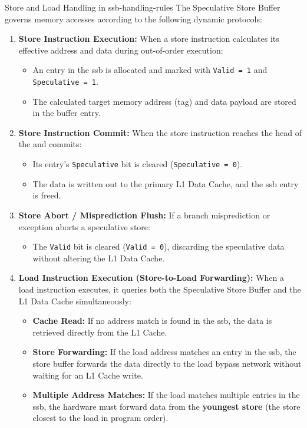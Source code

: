 \begin{definition}{Store and Load Handling in }{ssb-handling-rules}
The Speculative Store Buffer governs memory accesses according to the following dynamic protocols:
\begin{enumerate}
    \item \textbf{Store Instruction Execution:} When a store instruction calculates its effective address and data during out-of-order execution:
    \begin{itemize}
        \item An entry in the \gls{ssb} is allocated and marked with \texttt{Valid = 1} and \texttt{Speculative = 1}.
        \item The calculated target memory address (tag) and data payload are stored in the buffer entry.
    \end{itemize}
    \item \textbf{Store Instruction Commit:} When the store instruction reaches the head of the  and commits:
    \begin{itemize}
        \item Its entry's \texttt{Speculative} bit is cleared (\texttt{Speculative = 0}).
        \item The data is written out to the primary L1 Data Cache, and the \gls{ssb} entry is freed.
    \end{itemize}
    \item \textbf{Store Abort / Misprediction Flush:} If a branch misprediction or exception aborts a speculative store:
    \begin{itemize}
        \item The \texttt{Valid} bit is cleared (\texttt{Valid = 0}), discarding the speculative data without altering the L1 Data Cache.
    \end{itemize}
    \item \textbf{Load Instruction Execution (Store-to-Load Forwarding):} When a load instruction executes, it queries both the Speculative Store Buffer and the L1 Data Cache simultaneously:
    \begin{itemize}
        \item \textbf{Cache Read:} If no address match is found in the \gls{ssb}, the data is retrieved directly from the L1 Cache.
        \item \textbf{Store Forwarding:} If the load address matches an entry in the \gls{ssb}, the store buffer forwards the data directly to the load bypass network without waiting for an L1 Cache write.
        \item \textbf{Multiple Address Matches:} If the load matches multiple entries in the \gls{ssb}, the hardware must forward data from the \textbf{youngest store} (the store closest to the load in program order).
    \end{itemize}
\end{enumerate}
\end{definition}

